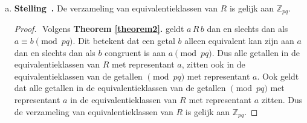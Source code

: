 \documentclass[12pt, dutch, a4paper]{article}
\theoremstyle{definition}
\newenvironment{shortthm}
  {\refstepcounter{theorem}\textbf{Stelling~\thetheorem.}}%
{\enskip}
\begin{document}
\begin{enumerate}[(a).]
  Dit is een biconditionele implicatie, dus de implicatie moet allebei de kanten op gelden.
  Eerst bewijs ik de implicatie van links naar rechts, 
  dat wil zeggen $a\,R\,b$ impliceert $a \equiv b \pmod{pq}$.

  \begin{proof} $ $ \newline
    Neem aan $a\,R\,b$. \newline
    Dan geldt vanuit de definitie van $R$ dat $p \mid b - a$ en $q \mid b - a$. 

    Omdat $p$ en $q$ priemgetallen zijn, kunnen dit geen delers van elkaar zijn. \newline
    Omdat geldt $p \mid b - a$ \'en $q \mid b - a$, 
    kunnen we $b - a$ schrijven als $b - a = kpq$ voor een $k \in \mathbb{Z}$.

    Dus $b - a \equiv 0 \pmod{pq}$ en $b \equiv a \pmod{pq}$. \newline
  \end{proof}

  Om het bewijs van \textbf{Theorem \ref{theorem2}.} af te maken, 
  bewijzen we nu de implicatie de andere kant op. 
  Dat wil zeggen $a \equiv b \pmod{pq}$ impliceert $a\,R\,b$.
  
  \begin{proof} $ $ \newline
    Neem aan $a \equiv b \pmod{pq}$. \newline
    Dus $a - b \equiv 0 \pmod{pq}$. \newline
    Dus $b - a \equiv 0 \pmod{pq}$. \newline
    Dus $pq \mid b - a$. \newline  
    Dan kunnen we $  - a$ schrijven als $b - a = kpq$ voor een $k \in \mathbb{Z}$. \newline
    Dus $p \mid b - a$ en $q \mid b - a$. \newline
  \end{proof}

  \item 
  \begin{shortthm}
    De verzameling van equivalentieklassen van $R$ is gelijk aan $\mathbb{Z}_{pq}$.
  \end{shortthm}

  \begin{proof} $ $ \newline
    Volgens \textbf{Theorem \ref{theorem2}.} geldt $a\,R\,b$ dan en slechts dan als 
    $a \equiv b \pmod{pq}$. 
    Dit betekent dat een getal $b$ alleen equivalent kan zijn aan $a$ dan en slechts dan 
    als $b$ congruent is aan $a \pmod{pq}$.
    Dus alle getallen in de equivalentieklassen van $R$ met representant $a$,
    zitten ook in de equivalentieklassen van de getallen $\pmod{pq}$ met representant $a$. 
    Ook geldt dat  
    alle getallen in de equivalentieklassen van de getallen $\pmod{pq}$ met representant $a$
    in de equivalentieklassen van $R$ met representant $a$ zitten. 
    Dus de verzameling van equivalentieklassen van $R$ is gelijk aan $\mathbb{Z}_{pq}$.  
    \newline
  \end{proof}
\end{enumerate}
\end{document}
